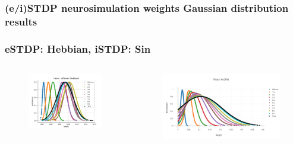 \documentclass[12pt, aspectratio=169]{beamer}
\begin{document}
\subsubsection{(e/i)STDP neurosimulation weights Gaussian distribution results}

\begin{frame}
\frametitle{eSTDP: Hebbian, iSTDP: Sin}
\begin{columns}[c] %

\begin{figure}
\includegraphics[width=1\linewidth]{Gauss_Fl_Aff_Hebb}
\end{figure}
\begin{figure}
\includegraphics[width=1\linewidth]{Gauss_FlexorIA_sin}
\end{figure}
\end{columns}
\end{frame}
\end{document}
